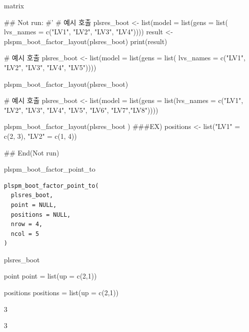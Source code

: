 \documentclass[a4paper]{book}
\begin{document}
%
\begin{Value}
matrix
\end{Value}
%
\begin{Examples}
\begin{ExampleCode}

\#\# Not run: 
#'
# 예시 호출
plsres_boot <- list(model = list(gens = list(
                  lvs_names = c("LV1", "LV2", "LV3", "LV4"))))
result <- plspm_boot_factor_layout(plsres_boot)
print(result)

# 예시 호출
plsres_boot <- list(model =
list(gens = list(
lvs_names = c("LV1", "LV2", "LV3", "LV4", "LV5"))))

plspm_boot_factor_layout(plsres_boot)

# 예시 호출
plsres_boot <- list(model = list(gens =
list(lvs_names = c("LV1", "LV2", "LV3",
"LV4", "LV5", "LV6", "LV7","LV8"))))


plspm_boot_factor_layout(plsres_boot )
###EX)
positions <- list("LV1" = c(2, 3), "LV2" = c(1, 4))


## End(Not run)


\end{ExampleCode}
\end{Examples}
%
\begin{Description}
plspm\_boot\_factor\_point\_to
\end{Description}
%
\begin{Usage}
\begin{verbatim}
plspm_boot_factor_point_to(
  plsres_boot,
  point = NULL,
  positions = NULL,
  nrow = 4,
  ncol = 5
)
\end{verbatim}
\end{Usage}
%
\begin{Arguments}
\begin{ldescription}
\item[\code{plsres\_boot}] plsres\_boot

\item[\code{point}] point point = list(up = c(2,1))

\item[\code{positions}] positions positions = list(up = c(2,1))

\item[\code{nrow}] 3

\item[\code{ncol}] 3
\end{ldescription}
\end{Arguments}
\end{document}
